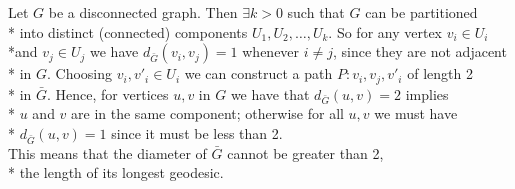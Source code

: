 Let $G$ be a disconnected graph. Then $\exists k > 0$ such that $G$ can be partitioned\\* into distinct (connected) components $U_1, U_2, \dots ,U_k$. So for any vertex $v_i \in U_i$ \\*and $v_j \in U_j$ we have $d_{\bar{G}}\left(v_i, v_j\right) = 1$  whenever $ i \neq j$, since they are not adjacent\\* in $G$. Choosing $v_i , v'_i \in U_i$ we can construct a path $P: v_i, v_j, v'_i$ of length 2\\* in $\bar{G}$. Hence, for vertices $u,v$ in $G$ we have that $d_{\bar{G}}\left(u,v\right) = 2$  implies\\* $u$ and $v$ are in the same component;  otherwise for all $u,v$ we must have \\* $d_{\bar{G}}\left(u,v\right) = 1$ since it must be less than 2.\\ This means that the diameter of $\bar{G}$ cannot be greater than 2,\\* the length of its longest geodesic.
